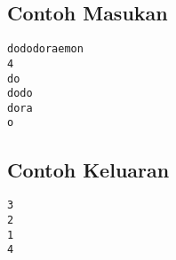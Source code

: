 \documentclass{article}
\begin{document}
\begin{multicols}{2}
\subsection*{Contoh Masukan}
\begin{lstlisting}
dododoraemon
4
do
dodo
dora
o

\end{lstlisting}
\columnbreak
\subsection*{Contoh Keluaran}
\begin{lstlisting}
3
2
1
4

\end{lstlisting}
\vfill
\null
\end{multicols}
\end{document}

